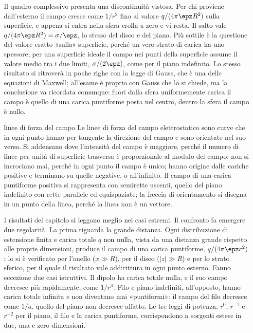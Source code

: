 \documentclass[main.tex]{subfiles}
\begin{document}
Il quadro complessivo presenta una discontinuità vistosa. Per chi proviene dall'esterno il campo cresce come $1/r^2$ fino al valore $q/(4\pi\epz R^2)$ sulla superficie, e appena si entra nella sfera crolla a zero e vi resta. Il salto vale $q/(4\pi\epz R^2)=\sigma/\epz$, lo stesso del disco e del piano. Più sottile è la questione del valore esatto «sulla» superficie, perché un vero strato di carica ha uno spessore; per una superficie ideale il campo nei punti della superficie assume il valore medio tra i due limiti, $\sigma/(2\epz)$, come per il piano indefinito. Lo stesso risultato si ritroverà in poche righe con la legge di Gauss, che è una delle equazioni di Maxwell; all'esame è proprio con Gauss che lo si chiede, ma la conclusione va ricordata comunque: fuori dalla sfera uniformemente carica il campo è quello di una carica puntiforme posta nel centro, dentro la sfera il campo è nullo.

\renewcommand{\richiamoprefix}{Richiamo --- }
\begin{richiamo}{linee di forza del campo}
Le linee di forza del campo elettrostatico sono curve che in ogni punto hanno per tangente la direzione del campo e sono orientate nel suo verso. Si addensano dove l'intensità del campo è maggiore, perché il numero di linee per unità di superficie trasversa è proporzionale al modulo del campo; non si incrociano mai, perché in ogni punto il campo è unico; hanno origine dalle cariche positive e terminano su quelle negative, o all'infinito. Il campo di una carica puntiforme positiva si rappresenta con semirette uscenti, quello del piano indefinito con rette parallele ed equispaziate; la freccia di orientamento si disegna in un punto della linea, perché la linea non è un vettore.
\end{richiamo}

I risultati del capitolo si leggono meglio nei casi estremi. Il confronto fa emergere due regolarità. La prima riguarda la grande distanza. Ogni distribuzione di estensione finita e carica totale $q$ non nulla, vista da una distanza grande rispetto alle proprie dimensioni, produce il campo di una carica puntiforme, $q/(4\pi\epz r^2)$: lo si è verificato per l'anello ($x\gg R$), per il disco ($|z|\gg R$) e per lo strato sferico, per il quale il risultato vale addirittura in ogni punto esterno. Fanno eccezione due casi istruttivi. Il dipolo ha carica totale nulla, e il suo campo decresce più rapidamente, come $1/r^3$. Filo e piano indefiniti, all'opposto, hanno carica totale infinita e non diventano mai «puntiformi»: il campo del filo decresce come $1/a$, quello del piano non decresce affatto. Le tre leggi di potenza, $r^{0}$, $r^{-1}$ e $r^{-2}$ per il piano, il filo e la carica puntiforme, corrispondono a sorgenti estese in due, una e zero dimensioni.
\end{document}
